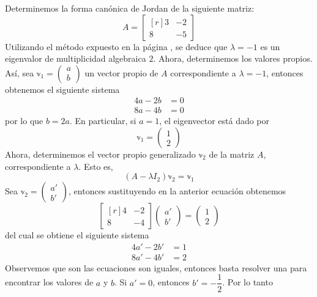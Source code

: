 \begin{example}
    Determinemos la forma canónica de Jordan de la siguiente matriz:
    $$A = \begin{bmatrix*}[r]
        3 & -2 \\
        8 & -5
    \end{bmatrix*}$$
    Utilizando el método expuesto en la página \pageref{metodo_eigen_2x2}, se deduce que $\lambda = -1$ es un eigenvalor de multiplicidad algebraica $2$. Ahora, determinemos los valores propios. Así, sea $\mathbb{v}_1 = \begin{pmatrix} a \\ b \end{pmatrix}$ un vector propio de $A$ correspondiente a $\lambda = -1$, entonces obtenemos el siguiente sistema
    \begin{align*}
        4a - 2b & = 0 \\
        8a - 4b & = 0
    \end{align*}
    por lo que $b = 2a$. En particular, si $a = 1$, el eigenvector está dado por
    $$\mathbb{v}_1 = \begin{pmatrix} 1 \\ 2 \end{pmatrix}$$\newpage\noindent
    Ahora, determinemos el vector propio generalizado $\mathbb{v}_2$ de la matriz $A$, correspondiente a $\lambda$. Esto es,
    $$(A - \lambda I_2) \mathbb{v}_2 = \mathbb{v}_1$$
    Sea $\mathbb{v}_2 = \begin{pmatrix} a' \\ b' \end{pmatrix}$, entonces sustituyendo en la anterior ecuación obtenemos
    $$\begin{bmatrix*}[r]
        4 & -2 \\
        8 & -4
    \end{bmatrix*} \begin{pmatrix}
        a' \\
        b'
    \end{pmatrix} = \begin{pmatrix}
        1 \\
        2
    \end{pmatrix}$$
    del cual se obtiene el siguiente sistema
    \begin{align*}
        4a' - 2b' & = 1 \\
        8a' - 4b' & = 2
    \end{align*}
    Observemos que son las ecuaciones son iguales, entonces basta resolver una para encontrar los valores de $a$ y $b$. Si $a' = 0$, entonces $b' = - \dfrac{1}{2}$. Por lo tanto

\end{example}
